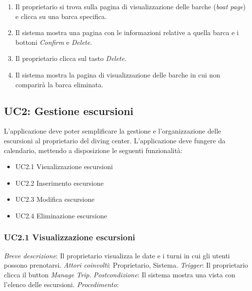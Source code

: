 \begin{enumerate}
    \item Il proprietario si trova sulla pagina di visualizzazione delle barche (\textit{boat page}) e clicca su una barca specifica. 
    \item Il sistema mostra una pagina con le informazioni relative a quella barca e i bottoni \textit{Confirm} e \textit{Delete}.
    \item Il proprietario clicca sul tasto \textit{Delete}.
    \item Il sistema mostra la pagina di visualizzazione delle barche in cui non comparirà la barca eliminata.
\end{enumerate}

\clearpage

\subsection{UC2: Gestione escursioni}
L'applicazione deve poter semplificare la gestione e l'organizzazione delle escursioni al proprietario del diving center.
L'applicazione deve fungere da calendario, mettendo a disposizione le seguenti funzionalità:

\begin{itemize}
    \item UC2.1 Visualizzazione escursioni
    \item UC2.2 Inserimento escursione
    \item UC2.3 Modifica escursione
    \item UC2.4 Eliminazione escursione
\end{itemize}

\subsubsection{UC2.1 Visualizzazione escursioni}

 \emph{Breve descrizione}: Il proprietario visualizza le date e i turni in cui gli utenti possono prenotarsi.\medbreak
 \emph{Attori coinvolti}: Proprietario, Sistema.\medbreak
 \emph{Trigger}: Il proprietario clicca il button \textit{Manage Trip}.\medbreak
 \emph{Postcondizione}: Il sistema mostra una vista con l'elenco delle escursioni.\medbreak
 \emph{Procedimento}:

